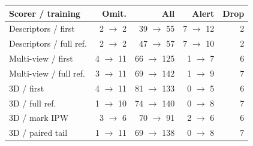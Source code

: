 \begin{tabular}{lrrrr}
\toprule
Scorer / training & Omit. & All & Alert & Drop \\
\midrule
Descriptors / first & 2 $\to$ 2 & 39 $\to$ 55 & 7 $\to$ 12 & 2 \\
Descriptors / full ref. & 2 $\to$ 2 & 47 $\to$ 57 & 7 $\to$ 10 & 2 \\
Multi-view / first & 4 $\to$ 11 & 66 $\to$ 125 & 1 $\to$ 7 & 6 \\
Multi-view / full ref. & 3 $\to$ 11 & 69 $\to$ 142 & 1 $\to$ 9 & 7 \\
3D / first & 4 $\to$ 11 & 81 $\to$ 133 & 0 $\to$ 5 & 6 \\
3D / full ref. & 1 $\to$ 10 & 74 $\to$ 140 & 0 $\to$ 8 & 7 \\
3D / mark IPW & 3 $\to$ 6 & 70 $\to$ 91 & 2 $\to$ 6 & 6 \\
3D / paired tail & 1 $\to$ 11 & 69 $\to$ 138 & 0 $\to$ 8 & 7 \\
\bottomrule
\end{tabular}
